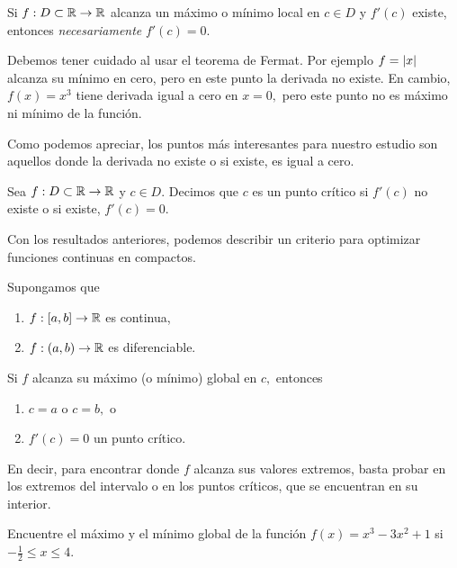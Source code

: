     \begin{teorema}
        Si $f:D\subset \mathbb{R} \to \mathbb{R}$ alcanza un máximo o mínimo local en $c\in D$ y $f'(c)$ existe, entonces \emph{necesariamente}
        $f'(c)=0.$
    \end{teorema}


    \begin{observacion}
        Debemos tener cuidado al usar el teorema de Fermat. Por ejemplo $f=\left|x\right|$ alcanza su mínimo en cero, pero en este
        punto la derivada no existe. En cambio, $f(x)=x^{3}$ tiene derivada igual a cero en $x=0,$ pero este punto no es máximo
        ni mínimo de la función.
    \end{observacion}


    Como podemos apreciar, los puntos más interesantes para nuestro estudio son aquellos donde la derivada no existe o si
    existe, es igual a cero.


    \begin{definicion}
        Sea $f:D \subset \mathbb{R} \to \mathbb{R}$ y $c\in D.$ Decimos que $c$ es un punto crítico si $f'(c)$ no existe o si existe,
        $f'(c)=0.$
    \end{definicion}


    Con los resultados anteriores, podemos describir un criterio para optimizar funciones continuas en compactos.


    \begin{proposicion}
        \label{opt:compacto}
        Supongamos que
        \begin{enumerate}
            \item $f:[a,b]\to \mathbb{R}$ es continua,
            \item $f:(a,b)\to \mathbb{R}$ es diferenciable.
        \end{enumerate}
        Si $f$ alcanza su máximo (o mínimo) global en $c,$ entonces
        \begin{enumerate}
            \item $c=a$ o $c=b,$ o
            \item $f'(c)=0$ un punto crítico.
        \end{enumerate}
    \end{proposicion}


    En decir, para encontrar donde $f$ alcanza sus valores extremos, basta probar en los extremos del intervalo o en los
    puntos críticos, que se encuentran en su interior.


    \begin{resuelto}
        Encuentre el máximo y el mínimo global de la función $f(x)=x^{3}-3x^{2}+1$ si $-\frac{1}{2}\leq x \leq 4.$
    \end{resuelto}

